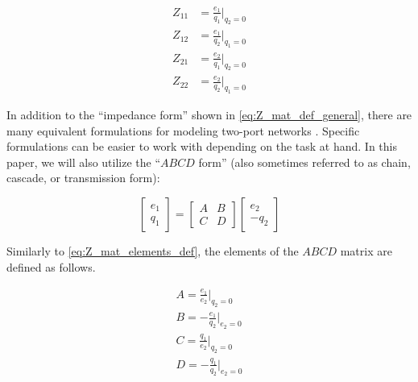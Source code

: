 \documentclass[lettersize,journal]{IEEEtran}
\begin{document}
\begin{subequations} \label{eq:Z_mat_elements_def}
        \begin{align}
                Z_{11}& = \frac{e_1}{q_1} \bigg \vert_{q_2=0} \label{eq:Z_mat_elements_def_Z11} \\[1em]
                Z_{12}& = \frac{e_1}{q_2} \bigg \vert_{q_1=0} \label{eq:Z_mat_elements_def_Z12} \\[1em]
                Z_{21}& = \frac{e_2}{q_1} \bigg \vert_{q_2=0} \label{eq:Z_mat_elements_def_Z21} \\[1em]
                Z_{22}& = \frac{e_2}{q_2} \bigg \vert_{q_1=0} \label{eq:Z_mat_elements_def_Z22}
        \end{align}
\end{subequations}

In addition to the ``impedance form'' shown in \eqref{eq:Z_mat_def_general}, there are many equivalent formulations for modeling two-port networks \cite{Frickey:1994aa}.
Specific formulations can be easier to work with depending on the task at hand.
In this paper, we will also utilize the ``$ABCD$ form'' (also sometimes referred to as chain, cascade, or transmission form):

\begin{equation}
        \label{eq:abcd_mat_def_general}
        \begin{bmatrix} e_1 \\ q_1 \end{bmatrix}
        = 
        \begin{bmatrix} A & B \\ C & D \end{bmatrix}
        \begin{bmatrix} e_2 \\ - q_2 \end{bmatrix}
\end{equation}

\noindent{}Similarly to \eqref{eq:Z_mat_elements_def}, the elements of the $ABCD$ matrix are defined as follows.

\begin{subequations} \label{eq:abcd_mat_elements_def}
        \begin{align}
                A = \frac{e_1}{e_2} \bigg \vert_{q_2=0} \label{eq:abcd_mat_elements_def_a} \\[1em]
                B = - \frac{e_1}{q_2} \bigg \vert_{e_2=0} \label{eq:abcd_mat_elements_def_b} \\[1em]
                C = \frac{q_1}{e_2} \bigg \vert_{q_2=0} \label{eq:abcd_mat_elements_def_c} \\[1em]
                D = - \frac{q_1}{q_2} \bigg \vert_{e_2=0} \label{eq:abcd_mat_elements_def_d}
        \end{align}
\end{subequations}
\end{document}
